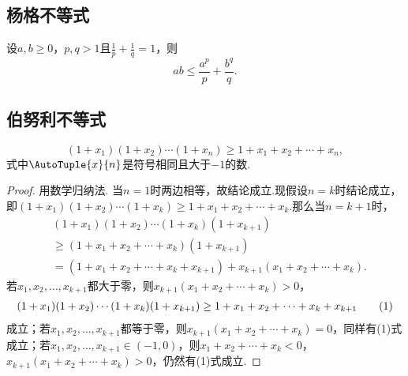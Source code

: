 \subsection{杨格不等式}
\begin{corollary}[杨格不等式]\label{theorem:不等式.杨格不等式}
设\(a,b\geq0\)，\(p,q>1\)且\(\frac{1}{p}+\frac{1}{q}=1\)，则
\begin{equation}
ab \leq \frac{a^p}{p} + \frac{b^q}{q}.
\end{equation}
\end{corollary}

\subsection{伯努利不等式}
\begin{theorem}[伯努利不等式]\label{theorem:不等式.伯努利不等式}
\begin{equation}
(1+x_1)(1+x_2)\dotsm(1+x_n) \geq 1+x_1+x_2+\dotsb+x_n,
\end{equation}
式中\(\AutoTuple{x}{n}\)是符号相同且大于\(-1\)的数.
\begin{proof}
用数学归纳法.
当\(n=1\)时两边相等，故结论成立.现假设\(n=k\)时结论成立，即\((1+x_1)(1+x_2)\dotsm(1+x_k) \geq 1+x_1+x_2+\dotsb+x_k\).那么当\(n=k+1\)时，\begin{align*}
&(1+x_1)(1+x_2)\dotsm(1+x_k)(1+x_{k+1}) \\
&\geq (1+x_1+x_2+\dotsb+x_k)(1+x_{k+1}) \\
&= (1+x_1+x_2+\dotsb+x_k+x_{k+1}) + x_{k+1}(x_1+x_2+\dotsb+x_k).
\end{align*}
若\(x_1,x_2,\dotsc,x_{k+1}\)都大于零，则\(x_{k+1}(x_1+x_2+\dotsb+x_k) > 0\)，\begin{gather}
(1+x_1)(1+x_2)\dotsm(1+x_k)(1+x_{k+1}) \geq 1+x_1+x_2+\dotsb+x_k+x_{k+1}
\tag1
\end{gather}成立；若\(x_1,x_2,\dotsc,x_{k+1}\)都等于零，则\(x_{k+1}(x_1+x_2+\dotsb+x_k) = 0\)，同样有(1)式成立；若\(x_1,x_2,\dotsc,x_{k+1}\in(-1,0)\)，则\(x_1+x_2+\dotsb+x_k < 0\)，\(x_{k+1}(x_1+x_2+\dotsb+x_k) > 0\)，仍然有(1)式成立.
\end{proof}
\end{theorem}

